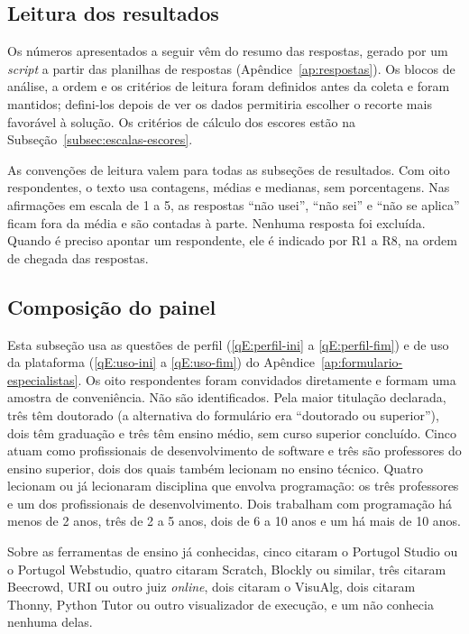 \subsection{Leitura dos resultados}
\label{subsec:leitura-resultados}

Os números apresentados a seguir vêm do resumo das respostas, gerado por um \textit{script} a partir das planilhas de respostas (Apêndice~\ref{ap:respostas}). Os blocos de análise, a ordem e os critérios de leitura foram definidos antes da coleta e foram mantidos; defini-los depois de ver os dados permitiria escolher o recorte mais favorável à solução. Os critérios de cálculo dos escores estão na Subseção~\ref{subsec:escalas-escores}.

As convenções de leitura valem para todas as subseções de resultados. Com oito respondentes, o texto usa contagens, médias e medianas, sem porcentagens. Nas afirmações em escala de 1 a 5, as respostas ``não usei'', ``não sei'' e ``não se aplica'' ficam fora da média e são contadas à parte. Nenhuma resposta foi excluída. Quando é preciso apontar um respondente, ele é indicado por R1 a R8, na ordem de chegada das respostas.

\subsection{Composição do painel}
\label{sec:resultado-painel}

Esta subseção usa as questões de perfil (\ref{qE:perfil-ini} a \ref{qE:perfil-fim}) e de uso da plataforma (\ref{qE:uso-ini} a \ref{qE:uso-fim}) do Apêndice~\ref{ap:formulario-especialistas}. Os oito respondentes foram convidados diretamente e formam uma amostra de conveniência. Não são identificados. Pela maior titulação declarada, três têm doutorado (a alternativa do formulário era ``doutorado ou superior''), dois têm graduação e três têm ensino médio, sem curso superior concluído. Cinco atuam como profissionais de desenvolvimento de software e três são professores do ensino superior, dois dos quais também lecionam no ensino técnico. Quatro lecionam ou já lecionaram disciplina que envolva programação: os três professores e um dos profissionais de desenvolvimento. Dois trabalham com programação há menos de 2 anos, três de 2 a 5 anos, dois de 6 a 10 anos e um há mais de 10 anos.

Sobre as ferramentas de ensino já conhecidas, cinco citaram o Portugol Studio ou o Portugol Webstudio, quatro citaram Scratch, Blockly ou similar, três citaram Beecrowd, URI ou outro juiz \textit{online}, dois citaram o VisuAlg, dois citaram Thonny, Python Tutor ou outro visualizador de execução, e um não conhecia nenhuma delas.

